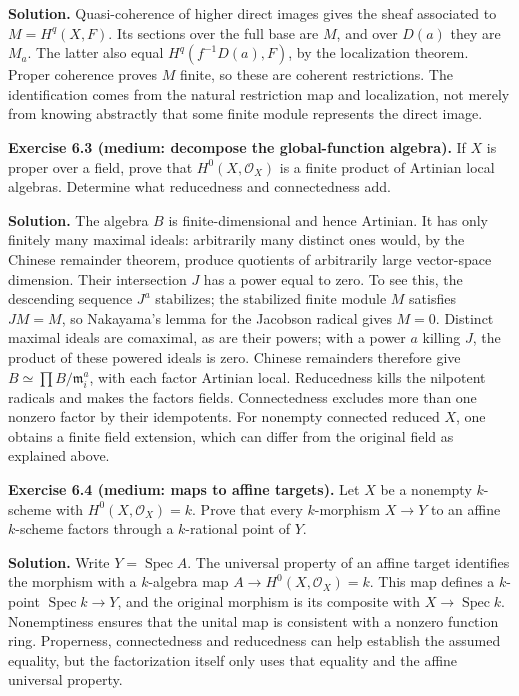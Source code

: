 \documentclass[11pt]{article}
\begin{document}
\textbf{Solution.} Quasi-coherence of higher direct images gives the
sheaf associated to \(M=H^q(X,F)\). Its sections over the full base are
\(M\), and over \(D(a)\) they are \(M_a\). The latter also equal
\(H^q(f^{-1}D(a),F)\), by the localization theorem. Proper coherence
proves \(M\) finite, so these are coherent restrictions. The
identification comes from the natural restriction map and localization,
not merely from knowing abstractly that some finite module represents
the direct image.

\textbf{Exercise 6.3 (medium: decompose the global-function algebra).}
If \(X\) is proper over a field, prove that \(H^0(X,\mathcal O_X)\) is a
finite product of Artinian local algebras. Determine what reducedness
and connectedness add.

\textbf{Solution.} The algebra \(B\) is finite-dimensional and hence
Artinian. It has only finitely many maximal ideals: arbitrarily many
distinct ones would, by the Chinese remainder theorem, produce quotients
of arbitrarily large vector-space dimension. Their intersection \(J\)
has a power equal to zero. To see this, the descending sequence \(J^a\)
stabilizes; the stabilized finite module \(M\) satisfies \(JM=M\), so
Nakayama's lemma for the Jacobson radical gives \(M=0\). Distinct
maximal ideals are comaximal, as are their powers; with a power \(a\)
killing \(J\), the product of these powered ideals is zero. Chinese
remainders therefore give \(B\simeq\prod B/\mathfrak m_i^a\), with each
factor Artinian local. Reducedness kills the nilpotent radicals and
makes the factors fields. Connectedness excludes more than one nonzero
factor by their idempotents. For nonempty connected reduced \(X\), one
obtains a finite field extension, which can differ from the original
field as explained above.

\textbf{Exercise 6.4 (medium: maps to affine targets).} Let \(X\) be a
nonempty \(k\)-scheme with \(H^0(X,\mathcal O_X)=k\). Prove that every
\(k\)-morphism \(X\to Y\) to an affine \(k\)-scheme factors through a
\(k\)-rational point of \(Y\).

\textbf{Solution.} Write \(Y=\operatorname{Spec}A\). The universal
property of an affine target identifies the morphism with a
\(k\)-algebra map \(A\to H^0(X,\mathcal O_X)=k\). This map defines a
\(k\)-point \(\operatorname{Spec}k\to Y\), and the original morphism is
its composite with \(X\to\operatorname{Spec}k\). Nonemptiness ensures
that the unital map is consistent with a nonzero function ring.
Properness, connectedness and reducedness can help establish the assumed
equality, but the factorization itself only uses that equality and the
affine universal property.
\end{document}
